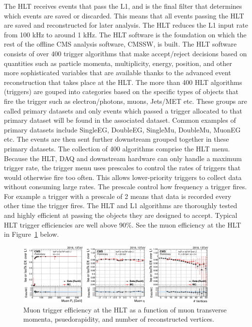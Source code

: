 The HLT receives events that pass the L1, and is the final filter that determines which events are saved or discarded. This means that all events passing the HLT are saved and reconstructed for later analysis.
The HLT reduces the L1 input rate from 100 kHz to around 1 kHz. The HLT software is the foundation on which the rest of the offline CMS analysis software, CMSSW, is built. The HLT software consists of over 400 trigger algorithms that make accept/reject decisions
based on quantities such as particle momenta, multiplicity, energy, position, and other more sophisticated variables that are available thanks to the advanced event reconstruction that takes place at the HLT.
The more than 400 HLT algorithms (triggers) are gouped into categories based on the specific types of objects that fire the trigger such as electron/photons, muons, Jets/MET etc. These groups are called primary datasets and only events which passed a trigger
allocated to that primary dataset will be found in the associated dataset. Common examples of primary datasets include SingleEG, DoubleEG, SingleMu, DoubleMu, MuonEG etc. The events are then sent further downstream grouped together in these primary datasets.
The collection of 400 algorithms comprise the HLT menu.
Because the HLT, DAQ and downstream hardware can only handle a maximum trigger
rate, the trigger menu uses prescales to control the rates of triggers that would otherwise fire too often. This allows lower-priority triggers to collect data
without consuming large rates. The prescale control how frequency a trigger fires. For example a trigger with a prescale of 2 means that
data is recorded every other time the trigger fires.
The HLT and L1 algorithms are thoroughly tested and highly efficient at passing the objects they are
designed to accept. Typical HLT trigger efficiencies are well above 90$\%$. See the muon efficiency at the HLT in Figure~\ref{fig:hlt_eff_muons} below. 

\begin{figure}[hbtp]
 \begin{center}
   \includegraphics[width=0.9\textwidth]{ch3_figs/hlt_eff_muons.pdf}
   \caption[Trigger efficiency at the HLT]{Muon trigger efficiency at the HLT as a function of muon transverse momenta, psuedorapidity, and number of reconstructed vertices.}
   \label{fig:hlt_eff_muons}
 \end{center}
\end{figure}

